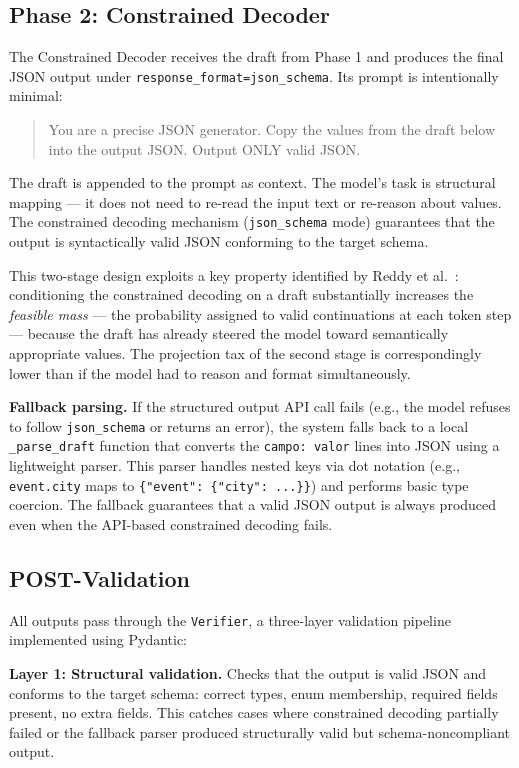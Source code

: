 \documentclass{ceurart}
\begin{document}
\subsection{Phase 2: Constrained Decoder}

The Constrained Decoder receives the draft from Phase 1 and produces the final JSON
output under \texttt{response\_format=json\_schema}.
Its prompt is intentionally minimal:

\begin{quote}
You are a precise JSON generator. Copy the values from the draft below into the output
JSON. Output ONLY valid JSON.
\end{quote}

The draft is appended to the prompt as context.
The model's task is structural mapping --- it does not need to re-read the input text
or re-reason about values.
The constrained decoding mechanism (\texttt{json\_schema} mode) guarantees that the
output is syntactically valid JSON conforming to the target schema.

This two-stage design exploits a key property identified by
Reddy et al.~\cite{Reddy2026}: conditioning the constrained decoding on a draft
substantially increases the \emph{feasible mass} --- the probability assigned to valid
continuations at each token step --- because the draft has already steered the model
toward semantically appropriate values.
The projection tax of the second stage is correspondingly lower than if the model had
to reason and format simultaneously.

\textbf{Fallback parsing.}
If the structured output API call fails (e.g., the model refuses to follow
\texttt{json\_schema} or returns an error), the system falls back to a local
\texttt{\_parse\_draft} function that converts the \texttt{campo: valor} lines into
JSON using a lightweight parser.
This parser handles nested keys via dot notation (e.g., \texttt{event.city} maps to
\texttt{\{"event": \{"city": ...\}\}}) and performs basic type coercion.
The fallback guarantees that a valid JSON output is always produced even when the
API-based constrained decoding fails.

\subsection{POST-Validation}

All outputs pass through the \texttt{Verifier}, a three-layer validation pipeline
implemented using Pydantic:

\textbf{Layer 1: Structural validation.}
Checks that the output is valid JSON and conforms to the target schema: correct types,
enum membership, required fields present, no extra fields.
This catches cases where constrained decoding partially failed or the fallback parser
produced structurally valid but schema-noncompliant output.
\end{document}
